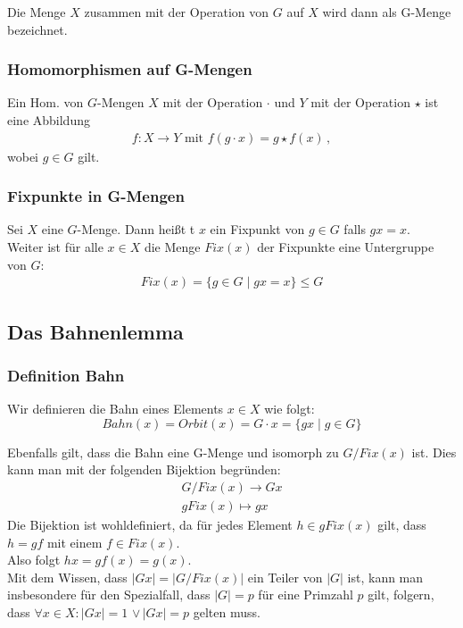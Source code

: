 \documentclass[12pt, german]{article}
\begin{document}
	Die Menge $X$ zusammen mit der Operation von $G$ auf $X$ wird dann als G-Menge bezeichnet.
	
	\subsubsection{Homomorphismen auf G-Mengen}
	Ein Hom. von $G$-Mengen $X$ mit der Operation $\cdot$ und $Y$ mit der Operation $\star$ ist eine Abbildung 
	\begin{align*}
		f: X \to Y \text{ mit } f(g \cdot x) = g \star f(x)\, ,
	\end{align*}
	wobei $g \in G$ gilt.
	
	\subsubsection{Fixpunkte in G-Mengen}
	Sei $X$ eine  $G$-Menge. Dann hei\ss t t $x$ ein Fixpunkt von $g \in G$ falls $gx=x$. \\
	Weiter ist für alle $x \in X$ die Menge $Fix(x)$  der Fixpunkte eine Untergruppe von $G$:
	\begin{align*}
		Fix(x) = \{g \in G \mid  gx = x\} \leq G 
	\end{align*}
	
	
	\subsection{Das Bahnenlemma}		
	\subsubsection{Definition Bahn}
	Wir definieren die Bahn eines Elements $x \in X$ wie folgt: $$Bahn(x) = Orbit(x) = G\cdot x = \{gx \mid  g \in G \}$$
	
	
	Ebenfalls gilt, dass die Bahn eine G-Menge und isomorph zu $G/Fix(x)$ ist. 
	Dies kann man mit der folgenden Bijektion begründen:
	\begin{align*}
		G/Fix(x) \to Gx \\ 
		gFix(x) \mapsto gx
	\end{align*}
	Die Bijektion ist wohldefiniert, da für jedes Element $h \in gFix(x)$ gilt, dass $h=gf$ mit einem $f \in Fix(x)$. \\ 
	Also folgt $hx = gf(x) = g(x)$.\\
	Mit dem Wissen, dass $|Gx|=|G/Fix(x)|$ ein Teiler von $|G|$ ist, kann man insbesondere für den Spezialfall, dass $|G| = p$ für eine Primzahl $p$ gilt, folgern, dass $\forall x \in X : |Gx|=1$ $\vee\, $$|Gx|=p$ gelten muss.
	
\end{document}
